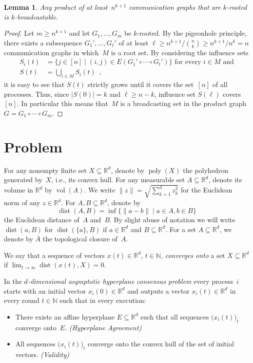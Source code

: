 \documentclass{article}
\newtheorem{lem}[thm]{Lemma}
\DeclareMathOperator{\vol}{vol}
\DeclareMathOperator{\dist}{dist}
\newcommand{\IR}{\mathbb{R}}
\newcommand{\IN}{\mathbb{N}}
\renewcommand{\geq}{\geqslant}
\DeclareMathOperator\poly{poly}
\begin{document}
\begin{lem}\label{lem:rooted:to:broadcastable}
Any product of at least~$n^{k+1}$ communication graphs that are $k$-rooted is
$k$-broadcastable.
\end{lem}
\begin{proof}
Let $m \geq n^{k+1}$ and let $G_1,\dots,G_m$ be $k$-rooted.
By the pigeonhole principle, there exists a subsequence $G_1',\dots,G_\ell'$ of at least
$\ell \geq n^{k+1}/\binom{n}{k}\geq n^{k+1}/n^k = n$ communication graphs in which~$M$ is a root set.
By considering the influence sets
\begin{align*}
S_i(t) &= \big\{ j\in[n] \mid (i,j) \in E(G_1'\circ \cdots \circ G_t') \big\} \text{ for every $i\in M$ and}\\
S(t)   &= \bigcup_{i \in M} S_i(t)\enspace,
\end{align*}
it is easy to see that $S(t)$ strictly grows until it covers the set~$[n]$ of all processes.
Thus, since $\lvert S(0)\rvert = k$ and $\ell \geq n-k$, influence set $S(\ell)$ covers~$[n]$.
In particular this means that~$M$ is a broadcasting set in the product graph $G = G_1\circ\cdots\circ G_m$.
\end{proof}

\section{Problem}\label{sec:problem}

For any nonempty finite set $X\subseteq \IR^d$, denote by $\poly(X)$ the
  polyhedron generated by~$X$, i.e., its convex hull.
For any measurable set $A\subseteq \IR^d$, denote its volume in $\IR^d$ by
$\vol(A)$.
We write $\lVert z \rVert = \sqrt{\sum_{k=1}^d z_k^2}$ for the Euclidean norm of any $z\in\IR^d$.
For $A,B\subseteq \IR^d$, denote by
\[
\dist(A,B)
=
\inf \big\{ \lVert a - b \rVert \mid a\in A, b\in B \big\}
\]
the Euclidean distance of~$A$ and~$B$.
By slight abuse of notation we will write $\dist(a,B)$ for $\dist(\{a\},B)$ if
$a\in\IR^d$ and $B\subseteq \IR^d$.
For a set $A\subseteq \IR^d$, we denote by $\bar{A}$ the topological closure
of~$A$.

We say that a sequence of vectors $x(t) \in \IR^d$, $t \in \IN$, \emph{converges onto} 
a set $X \subseteq \IR^d$ if $\displaystyle\lim_{t\to\infty}\dist(x(t),X) = 0$.

In the \emph{$d$-dimensional asymptotic hyperplane consensus problem} every
process~$i$ starts with an initial vector $x_i(0) \in \IR^d$ and outputs a
vector $x_i(t) \in \IR^d$ in every round $t\in\IN$ such that in every execution:
\begin{itemize}
\item There exists an affine hyperplane $E\subseteq \IR^d$ such that all sequences $\big(x_i(t)\big)_t$ converge onto~$E$.
\emph{(Hyperplane Agreement)}
\item All sequences $\big(x_i(t)\big)_t$ converge onto the convex hull of the set of initial vectors.
\emph{(Validity)}
\end{itemize}
\end{document}
